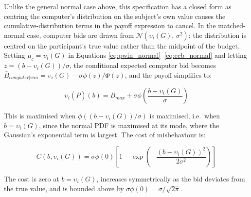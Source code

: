 Unlike the general normal case above, this specification has a closed form as centring the computer's distribution on the subject's own value causes the cumulative-distribution terms in the payoff expression to cancel. In the matched-normal case, computer bids are drawn from $\mathcal{N}(\upsilon_i(G),\, \sigma^2)$: the distribution is centred on the participant's true value rather than the midpoint of the budget. Setting $\mu_c = \upsilon_i(G)$ in Equations \ref{eq:pwin_normal}--\ref{eq:ecb_normal} and letting $z = (b - \upsilon_i(G))/\sigma$, the conditional expected computer bid becomes $\bar{B}_{computer|win} = \upsilon_i(G) - \sigma\phi(z)/\Phi(z)$, and the payoff simplifies to:

\begin{equation}
\upsilon_i(\overline{P})(b) = B_{max} + \sigma\phi\!\left(\frac{b - \upsilon_i(G)}{\sigma}\right)
\label{eq:payoff_matched}
\end{equation}

This is maximised when $\phi((b-\upsilon_i(G))/\sigma)$ is maximised, i.e.\ when $b = \upsilon_i(G)$, since the normal PDF is maximised at its mode, where the Gaussian's exponential term is largest. The cost of misbehaviour is:

\begin{equation}
C(b, \upsilon_i(G)) = \sigma\phi(0)\left[1 - \exp\!\left(-\frac{(b - \upsilon_i(G))^2}{2\sigma^2}\right)\right]
\label{eq:cost_matched}
\end{equation}

The cost is zero at $b = \upsilon_i(G)$, increases symmetrically as the bid deviates from the true value, and is bounded above by $\sigma\phi(0) = \sigma/\sqrt{2\pi}$.
